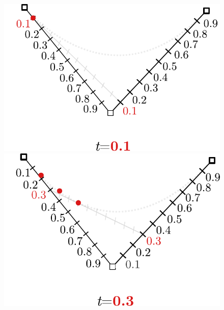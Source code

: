 \documentclass[12pt,openany,a4,usenames,dvipsnames]{book}
\begin{document}
\begin{figure}[H]
  \centering
  \begin{minipage}{0.49\textwidth}
    \includegraphics[width=\textwidth,keepaspectratio]{figures/bezier_step_0.1.pdf}
  \end{minipage}
  \hspace{.1em}
  \begin{minipage}{0.49\textwidth}
    \includegraphics[width=\textwidth,keepaspectratio]{figures/bezier_step_0.3.pdf}
  \end{minipage}
  \par
  \begin{minipage}{0.49\textwidth}

\end{minipage}
\end{figure}
\end{document}
